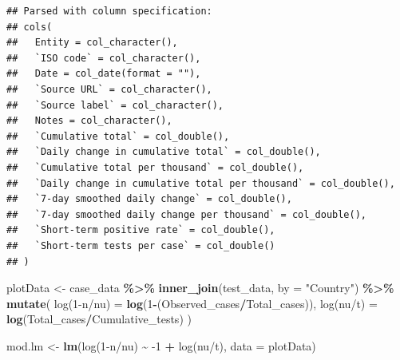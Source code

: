 \documentclass[
]{article}
\newenvironment{Shaded}{\begin{snugshade}}{\end{snugshade}}
\newcommand{\DataTypeTok}[1]{\textcolor[rgb]{0.13,0.29,0.53}{#1}}
\newcommand{\DecValTok}[1]{\textcolor[rgb]{0.00,0.00,0.81}{#1}}
\newcommand{\KeywordTok}[1]{\textcolor[rgb]{0.13,0.29,0.53}{\textbf{#1}}}
\newcommand{\NormalTok}[1]{#1}
\newcommand{\OperatorTok}[1]{\textcolor[rgb]{0.81,0.36,0.00}{\textbf{#1}}}
\newcommand{\StringTok}[1]{\textcolor[rgb]{0.31,0.60,0.02}{#1}}
\begin{document}
\begin{verbatim}
## Parsed with column specification:
## cols(
##   Entity = col_character(),
##   `ISO code` = col_character(),
##   Date = col_date(format = ""),
##   `Source URL` = col_character(),
##   `Source label` = col_character(),
##   Notes = col_character(),
##   `Cumulative total` = col_double(),
##   `Daily change in cumulative total` = col_double(),
##   `Cumulative total per thousand` = col_double(),
##   `Daily change in cumulative total per thousand` = col_double(),
##   `7-day smoothed daily change` = col_double(),
##   `7-day smoothed daily change per thousand` = col_double(),
##   `Short-term positive rate` = col_double(),
##   `Short-term tests per case` = col_double()
## )
\end{verbatim}

\begin{Shaded}
\begin{Highlighting}[]
\NormalTok{plotData \textless{}{-}}\StringTok{ }\NormalTok{case\_data }\OperatorTok{\%\textgreater{}\%}
\StringTok{  }\KeywordTok{inner\_join}\NormalTok{(test\_data, }\DataTypeTok{by =} \StringTok{"Country"}\NormalTok{) }\OperatorTok{\%\textgreater{}\%}
\StringTok{  }\KeywordTok{mutate}\NormalTok{(}
    \StringTok{\textasciigrave{}}\DataTypeTok{log(1{-}n/nu)}\StringTok{\textasciigrave{}}\NormalTok{ =}\StringTok{ }\KeywordTok{log}\NormalTok{(}\DecValTok{1}\OperatorTok{{-}}\NormalTok{(Observed\_cases}\OperatorTok{/}\NormalTok{Total\_cases)),}
    \StringTok{\textasciigrave{}}\DataTypeTok{log(nu/t)}\StringTok{\textasciigrave{}}\NormalTok{ =}\StringTok{ }\KeywordTok{log}\NormalTok{(Total\_cases}\OperatorTok{/}\NormalTok{Cumulative\_tests)}
\NormalTok{  )}
  


\NormalTok{mod.lm \textless{}{-}}\StringTok{ }\KeywordTok{lm}\NormalTok{(}\StringTok{\textasciigrave{}}\DataTypeTok{log(1{-}n/nu)}\StringTok{\textasciigrave{}} \OperatorTok{\textasciitilde{}}\StringTok{  }\DecValTok{{-}1} \OperatorTok{+}\StringTok{ \textasciigrave{}}\DataTypeTok{log(nu/t)}\StringTok{\textasciigrave{}}\NormalTok{, }\DataTypeTok{data =}\NormalTok{ plotData)}


\end{Highlighting}
\end{Shaded}
\end{document}
